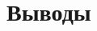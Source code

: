 \documentclass[12pt,a4paper]{amsart}
\theoremstyle{definition}
\theoremstyle{definition}
\begin{document}

\newpage
\section{Выводы}


\newpage

\begin{thebibliography}{9}

\end{thebibliography}

\vspace{0.7cm}
\end{document}
